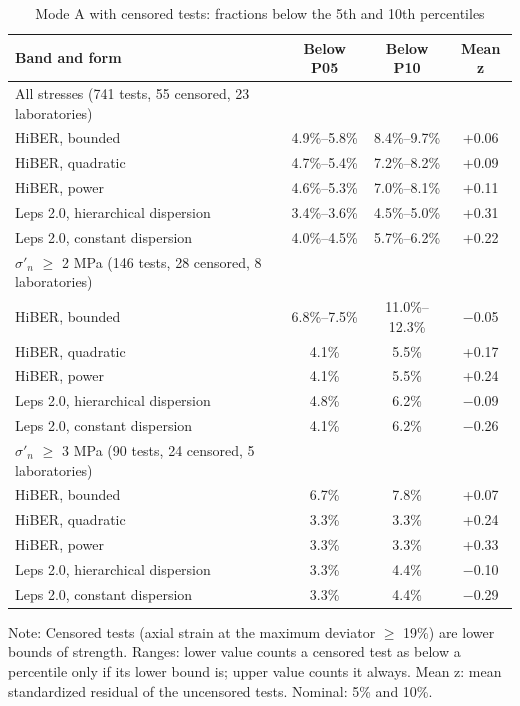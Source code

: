 \documentclass[Journal,letterpaper,InsideFigs,NoLists,NoLineNumbers]{ascelike-new}
\begin{document}
\begin{table}[htbp]
\caption{Mode A with censored tests: fractions below the 5th and 10th percentiles}
\centering\footnotesize
\renewcommand{\arraystretch}{1.2}
\setlength{\tabcolsep}{3.5pt}
\begin{tabular}{lccc}
\hline
Band and form & Below P05 & Below P10 & Mean z \\
\hline
All stresses (741 tests, 55 censored, 23 laboratories) &  &  &  \\
   HiBER, bounded & 4.9\%--5.8\% & 8.4\%--9.7\% & +0.06 \\
   HiBER, quadratic & 4.7\%--5.4\% & 7.2\%--8.2\% & +0.09 \\
   HiBER, power & 4.6\%--5.3\% & 7.0\%--8.1\% & +0.11 \\
   Leps 2.0, hierarchical dispersion & 3.4\%--3.6\% & 4.5\%--5.0\% & +0.31 \\
   Leps 2.0, constant dispersion & 4.0\%--4.5\% & 5.7\%--6.2\% & +0.22 \\
$\sigma'_n$ $\ge$ 2 MPa (146 tests, 28 censored, 8 laboratories) &  &  &  \\
   HiBER, bounded & 6.8\%--7.5\% & 11.0\%--12.3\% & $-$0.05 \\
   HiBER, quadratic & 4.1\% & 5.5\% & +0.17 \\
   HiBER, power & 4.1\% & 5.5\% & +0.24 \\
   Leps 2.0, hierarchical dispersion & 4.8\% & 6.2\% & $-$0.09 \\
   Leps 2.0, constant dispersion & 4.1\% & 6.2\% & $-$0.26 \\
$\sigma'_n$ $\ge$ 3 MPa (90 tests, 24 censored, 5 laboratories) &  &  &  \\
   HiBER, bounded & 6.7\% & 7.8\% & +0.07 \\
   HiBER, quadratic & 3.3\% & 3.3\% & +0.24 \\
   HiBER, power & 3.3\% & 3.3\% & +0.33 \\
   Leps 2.0, hierarchical dispersion & 3.3\% & 4.4\% & $-$0.10 \\
   Leps 2.0, constant dispersion & 3.3\% & 4.4\% & $-$0.29 \\
\hline
\end{tabular}
\par\vspace{4pt}\parbox{\linewidth}{\footnotesize Note: Censored tests (axial strain at the maximum deviator $\ge$ 19\%) are lower bounds of strength. Ranges: lower value counts a censored test as below a percentile only if its lower bound is; upper value counts it always. Mean z: mean standardized residual of the uncensored tests. Nominal: 5\% and 10\%.}
\end{table}
\end{document}
